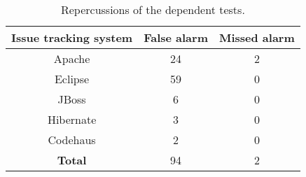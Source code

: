 \begin{table}
\begin{center}
\setlength{\tabcolsep}{0.5\tabcolsep}
\begin{tabular}{|c||c|c|}
\hline
\textbf{Issue tracking system} & \textbf{False alarm} & \textbf{Missed alarm} \\
\hline
Apache &24 & 2 \\
\hline
Eclipse & 59 & 0 \\
\hline
JBoss& 6 & 0 \\
\hline
Hibernate & 3 & 0 \\
\hline
Codehaus & 2 & 0 \\
\hline
\hline
\textbf{Total}  & 94 & 2 \\
\hline
\end{tabular}
\end{center}
\caption{
Repercussions of the \dtnum dependent tests.
}
\label{tab:reper}
\end{table}

